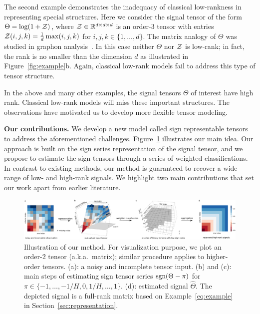 \documentclass{article}
\theoremstyle{plain}
\theoremstyle{definition}
\def\sign{\textup{sgn}}
\begin{document}
The second example demonstrates the inadequacy of classical low-rankness in representing special structures. Here we consider the signal tensor of the form $\Theta=\log(1+\mathcal{Z})$, where $\mathcal{Z}\in\mathbb{R}^{d\times d\times d}$ is an order-3 tensor with entries $\mathcal{Z}(i,j,k)={1\over d}\max(i,j,k)$ for $i,j,k\in\{1,\ldots,d\}$. The matrix analogy of $\Theta$ was studied in graphon analysis~\cite{chan2014consistent}. In this case neither $\Theta$ nor $\mathcal{Z}$ is low-rank; in fact, the rank is no smaller than the dimension $d$ as illustrated in Figure~\ref{fig:example}b. Again, classical low-rank models fail to address this type of tensor structure. 

In the above and many other examples, the signal tensors $\Theta$ of interest have high rank. Classical low-rank models will miss these important structures. The observations have motivated us to develop more flexible tensor modeling. 


{\bf Our contributions.} We develop a new model called sign representable tensors to address the aforementioned challenges. 
Figure~\ref{fig:demo} illustrates our main idea. Our approach is built on the sign series representation of the signal tensor, and we propose to estimate the sign tensors through a series of weighted classifications. In contrast to existing methods, our method is guaranteed to recover a wide range of low- and high-rank signals. We highlight two main contributions that set our work apart from earlier literature. 

\begin{figure}[h!]
\captionsetup{font=scriptsize}
\centerline{\includegraphics[width=1.05\textwidth]{figure/demo.pdf}}
\caption{\scriptsize Illustration of our method. For visualization purpose, we plot an order-2 tensor (a.k.a.\ matrix); similar procedure applies to higher-order tensors. (a): a noisy and incomplete tensor input. (b) and (c): main steps of estimating sign tensor series $\sign(\Theta-\pi)$ for $\pi\in  \{-1,\ldots,-{1/ H},0,{1/H},\ldots,1\}$. (d): estimated signal $\hat \Theta$. The depicted signal is a full-rank matrix based on Example~\ref{eq:example} in Section~\ref{sec:representation}.}\label{fig:demo}
\vspace{-.4cm}
\end{figure}
\end{document}
